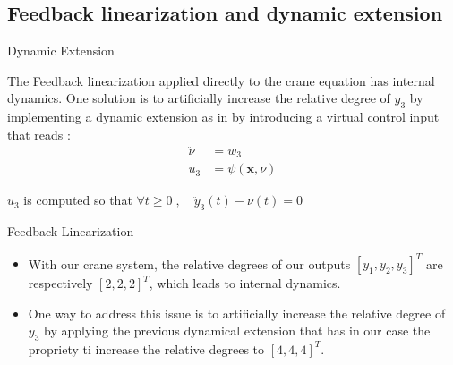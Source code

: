\subsection{Feedback linearization and dynamic extension}

\begin{frame}{Dynamic Extension}

The Feedback linearization applied directly to the crane equation has internal dynamics. One solution is to artificially increase the relative degree of \(y_3\) by implementing a dynamic extension as in \cite{Noack2020} by introducing a virtual control input that reads : 
\begin{align}
    \ddot{\nu} &= w_3 \\
    u_3 &= \psi(\boldsymbol{x}, \nu)
\end{align}

\(u_3\) is computed so that \(
    \forall t \ge 0 \; , \quad \ddot{y}_3(t) - \nu(t) = 0\) 
\end{frame}



\begin{frame}{Feedback Linearization}
   \begin{itemize}
       \item  With our crane system, the relative degrees of our outputs \([y_1, y_2, y_3]^T\) are respectively \([2, 2, 2]^T\), which leads to internal dynamics. 

       \item One way to address this issue is to artificially increase the relative degree of \(y_3\) by applying the previous dynamical extension that has in our case the propriety ti increase the relative degrees to  \([4, 4, 4]^T\).
   \end{itemize}
\end{frame}



